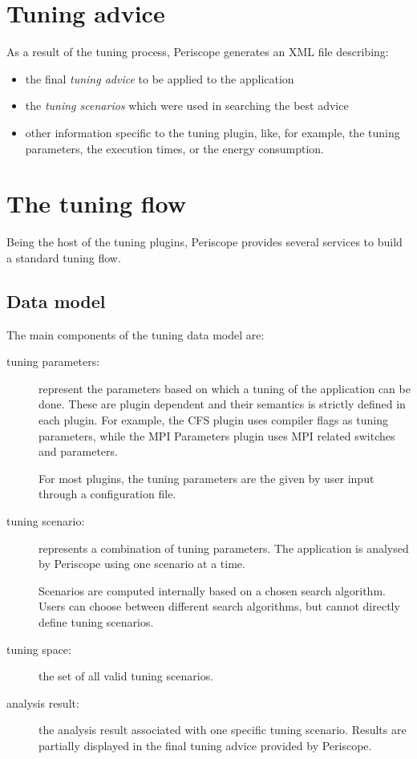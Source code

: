 \documentclass[11pt,oneside,a4paper]{book}
\begin{document}
\section{Tuning advice}\label{sec:uninstrumented}
As a result of the tuning process, Periscope generates an XML file describing:

\begin{itemize}
	\item the final \textit{tuning advice} to be applied to the application
	\item the \textit{tuning scenarios} which were used in searching the best advice
	\item other information specific to the tuning plugin, like, for example, the tuning parameters, the execution times, or the energy consumption.
\end{itemize}

\section{The tuning flow}
Being the host of the tuning plugins, Periscope provides several services to build a standard tuning flow.

\subsection*{Data model}
The main components of the tuning data model are:

\begin{description}
	\item[tuning parameters:] represent the parameters based on which a tuning of the application can be done. These are plugin dependent and their semantics is strictly defined in each plugin. For example, the CFS plugin uses compiler flags as tuning parameters, while the MPI Parameters plugin uses MPI related switches and parameters.
	
	For most plugins, the tuning parameters are the given by user input through a configuration file.
	
	\item[tuning scenario:] represents a combination of tuning parameters. The application is analysed by Periscope using one scenario at a time.
	
	Scenarios are computed internally based on a chosen search algorithm. Users can choose between different search algorithms, but cannot directly define tuning scenarios.
	
	\item[tuning space:] the set of all valid tuning scenarios.
	\item[analysis result:] the analysis result associated with one specific tuning scenario. Results are partially displayed in the final tuning advice provided by Periscope.
\end{description}
\end{document}
